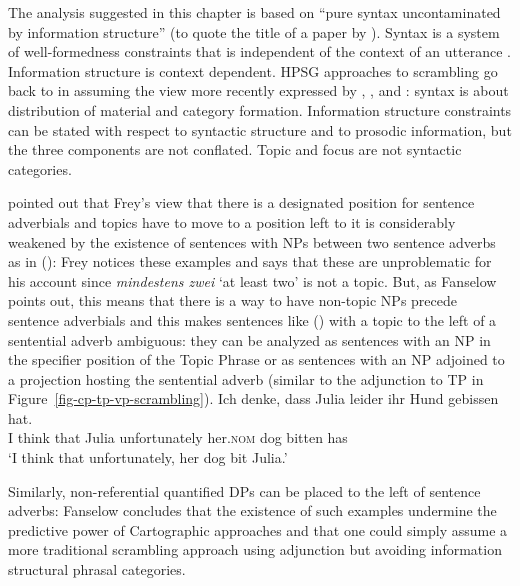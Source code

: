 The analysis suggested in this chapter is based on ``pure syntax uncontaminated by information
structure'' (to quote the title of a paper by \citealt{Fanselow2006a}). Syntax is a system of
well-formedness constraints that is independent of the context of an utterance \citep[]{Fanselow2006a}. Information
structure is context dependent. HPSG approaches to scrambling go back to \citet{Gunji86a} in assuming
the view more recently expressed by \citet{Fanselow2003b,Fanselow2006a}, \citet{NK2008a-u}, \citet[]{Struckmeier2017a} and \citet{Haider2021a}: syntax is
about distribution of material and category formation. Information structure constraints can be
stated with respect to syntactic structure \citep{EV94a,EV96a,DeKuthy2021a} and to prosodic information, but the three components are
not conflated. Topic and focus are not syntactic categories.  


\citet{Fanselow2006a} pointed out that Frey's view that there is a designated
position for sentence adverbials and topics have to move to a position left to it is considerably
weakened by the existence of sentences with NPs between two sentence adverbs as in ():
\ea
{}
\z
Frey notices these examples and says that these are unproblematic for his account since
\emph{mindestens zwei} `at least two' is not a topic. But, as Fanselow points out, this means that there is a way
to have non-topic NPs precede sentence adverbials and this makes sentences like () with a topic to the left of a
sentential adverb ambiguous: they can be analyzed as sentences with an NP in the specifier position
of the Topic Phrase or as sentences with an NP adjoined to a projection hosting the sentential
adverb (similar to the adjunction to TP in Figure~\ref{fig-cp-tp-vp-scrambling}).
\ea
\gll Ich denke, dass Julia leider        ihr Hund gebissen hat.\\
     I   think  that Julia unfortunately her.\textsc{nom} dog bitten has\\\german
\glt `I think that unfortunately, her dog bit Julia.'
\z

\noindent
Similarly, non-referential quantified DPs can be placed to the left of sentence adverbs:
\ea
{}
\z
Fanselow concludes that the existence of such examples undermine the predictive power of
Cartographic approaches and that one could simply assume a more traditional scrambling approach
using adjunction but avoiding information structural phrasal categories.

